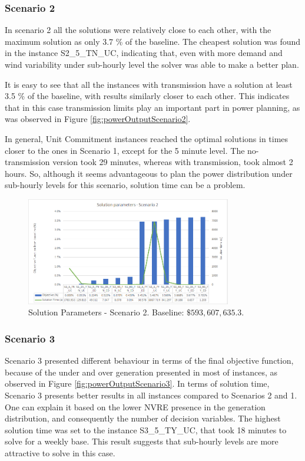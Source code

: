 \documentclass[12pt,LUDisStyle,twosided]{book}
\begin{document}
\subsubsection{Scenario 2}

In scenario 2 all the solutions were relatively close to each other, with the maximum solution as only 3.7 \% of the baseline. The cheapest solution was found in the instance S2\_5\_TN\_UC, indicating that, even with more demand and wind variability under sub-hourly level the solver was able to make a better plan.

It is easy to see that all the instances with transmission have a solution at least 3.5 \% of the baseline, with results similarly closer to each other. This indicates that in this case transmission limits play an important part in power planning, as was observed in Figure \ref{fig:powerOutputScenario2}.

In general, Unit Commitment instances reached the optimal solutions in times closer to the ones in Scenario 1, except for the 5 minute level. The no-transmission version took 29 minutes, whereas with transmission, took almost 2 hours. So, although it seems advantageous to plan the power distribution under sub-hourly levels for this scenario, solution time can be a problem.

\begin{figure}[H] 
  \centering  
	  \includegraphics[width=0.8\textwidth,height=\textheight,keepaspectratio]{SolutionParametersS2.png}  
  \caption{Solution Parameters - Scenario 2. Baseline: $\$593,607,635.3$.}
  \label{fig:solutionparameterss2}
\end{figure}

\subsubsection{Scenario 3}

Scenario 3 presented different behaviour in terms of the final objective function, because of the under and over generation presented in most of instances, as observed in Figure \ref{fig:powerOutputScenario3}. In terms of solution time, Scenario 3 presents better results in all instances compared to Scenarios 2 and 1. One can explain it based on the lower NVRE presence in the generation distribution, and consequently the number of decision variables. The highest solution time was set to the instance S3\_5\_TY\_UC, that took 18 minutes to solve for a weekly base. This result suggests that sub-hourly levels are more attractive to solve in this case.
\end{document}
